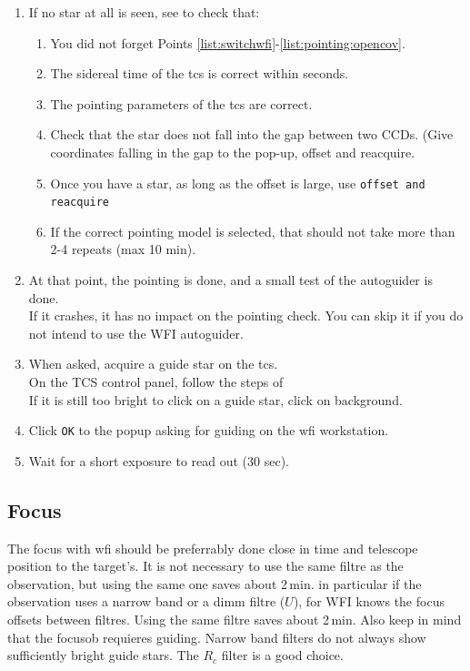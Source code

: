 \documentclass[11pt,fleqn,a4paper]{book}
\begin{document}
\begin{enumerate}
  \item If no star at all is seen, see 
     to check that:
    \begin{enumerate}
      \item You did not forget Points \ref{list:switchwfi}-\ref{list:pointing:opencov}.
      \item The sidereal time of the \gls{tcs} is correct within seconds.
      \item The pointing parameters of the \gls{tcs} are correct.
      \item Check that the star does not fall into the gap between two CCDs. (Give coordinates falling in the gap to the pop-up, offset and reacquire. 
      \item Once you have a star, as long as the offset is large, use \texttt{offset and reacquire}
      \item If the correct \gls{pointing model} is selected, that should not take more than 2-4 repeats (max 10 min).
    \end{enumerate}
  \item At that point, the \gls{pointing} is done, and a small test of the
        autoguider is done.\\
        If it crashes, it has no impact on the \gls{pointing}
        check.  You can skip it if you do not intend to use the WFI autoguider.
  \item When asked, acquire a guide star on the \gls{tcs}.\\
        On the \gls{TCS control panel}, follow the steps of \\
        If it is still too bright to click on a guide star, click on background.
  \item Click \texttt{OK} to the popup asking for guiding on the \gls{wfi} workstation.
  \item Wait for a short exposure to read out (30 sec).
\end{enumerate}

\subsection{Focus}

The \gls{focus} with \gls{wfi} should be preferrably done close in time and telescope position to the target's.  It is not necessary to use the same filtre as the observation, but using the same one saves about 2\,min. in particular if the observation uses a narrow band or a dimm filtre ($U$), for WFI knows the focus offsets between filtres.  Using the same filtre saves about 2\,min. Also keep in mind that the \gls{focus}\gls{ob} requieres guiding. Narrow band filters do not always show sufficiently bright guide stars. The $R_{c}$ filter is a good choice.
\end{document}
